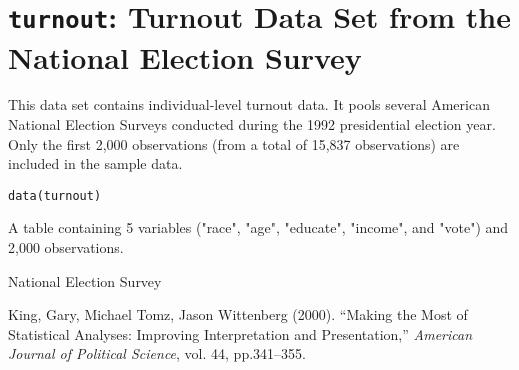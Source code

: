 \section{{\tt turnout}: Turnout Data Set from the National Election Survey}\label{ss:turnout}
\begin{Description}\relax
This data set contains individual-level turnout data. It pools several
American National Election Surveys conducted during the 1992 presidential
election year.  Only the first 2,000 observations (from a total of 15,837 
observations) are included in the sample data.
\end{Description}
\begin{Usage}
\begin{verbatim}data(turnout)\end{verbatim}
\end{Usage}
\begin{Format}\relax
A table containing 5 variables ("race", "age", "educate", 
"income", and "vote") and 2,000 observations.
\end{Format}
\begin{Source}\relax
National Election Survey
\end{Source}
\begin{References}\relax
King, Gary, Michael Tomz, Jason Wittenberg (2000).
``Making the Most of Statistical Analyses: Improving Interpretation and 
Presentation,'' \emph{American Journal of Political Science}, vol. 44,
pp.341--355.
\end{References}


